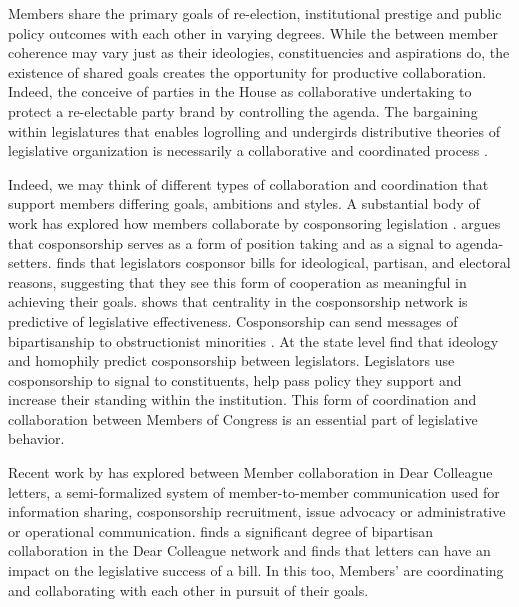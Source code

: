 \documentclass[11pt]{article}
\begin{document}
\begin{flushleft}
Members share the primary goals of re-election, institutional prestige and public policy outcomes with each other in varying degrees. While the between member coherence may vary just as their ideologies, constituencies and aspirations do, the existence of shared goals creates the opportunity for productive collaboration. Indeed, the \cite{cox2005setting} conceive of parties in the House as collaborative undertaking to protect a re-electable party brand by controlling the agenda. The bargaining within legislatures that enables logrolling and undergirds distributive theories of legislative organization is necessarily a collaborative and coordinated process \citep{baron1989bargaining, shepsle1987institutional, berry2015cardinals}.

Indeed, we may think of different types of collaboration and coordination that support members differing goals, ambitions and styles. A substantial body of work has explored how members collaborate by cosponsoring legislation \citep{zhang2008community,fowler2006connecting, koger2003position}. \cite{koger2003position} argues that cosponsorship serves as a form of position taking and as a signal to agenda-setters. \cite{campbell1982cosponsoring} finds that legislators cosponsor bills for ideological, partisan, and electoral reasons, suggesting that they see this form of cooperation as meaningful in achieving their goals.\cite{fowler2006connecting} shows that centrality in the cosponsorship network is predictive of legislative effectiveness. Cosponsorship can send messages of bipartisanship to obstructionist minorities \citep{wilson1997cosponsorship}. At the state level \cite{bratton2011networks} find that ideology and homophily predict cosponsorship between legislators. Legislators use cosponsorship to signal to constituents, help pass policy they support and increase their standing within the institution. This form of coordination and collaboration between Members of Congress is an essential part of legislative behavior.

Recent work by \cite{craig2015room} has explored between Member collaboration in Dear Colleague letters, a semi-formalized system of member-to-member communication used for information sharing, cosponsorship recruitment, issue advocacy or administrative or operational communication. \cite{craig2015room} finds a significant degree of bipartisan collaboration in the Dear Colleague network and \cite{craig2015cue} finds that letters can have an impact on the legislative success of a bill. In this too, Members' are coordinating and collaborating with each other in pursuit of their goals.


\end{flushleft}
\end{document}
